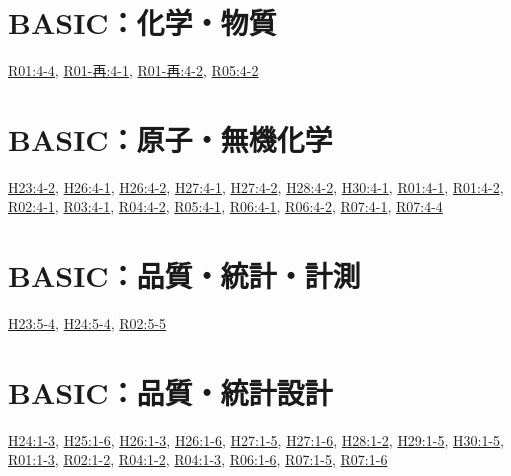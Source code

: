 \section{BASIC：化学・物質}
\hyperref[q:r01-reg-basic-4-4]{R01:4-4}, \hyperref[q:r01-ret-basic-4-1]{R01-再:4-1}, \hyperref[q:r01-ret-basic-4-2]{R01-再:4-2}, \hyperref[q:r05-reg-basic-4-2]{R05:4-2}
\section{BASIC：原子・無機化学}
\hyperref[q:h23-reg-basic-4-2]{H23:4-2}, \hyperref[q:h26-reg-basic-4-1]{H26:4-1}, \hyperref[q:h26-reg-basic-4-2]{H26:4-2}, \hyperref[q:h27-reg-basic-4-1]{H27:4-1}, \hyperref[q:h27-reg-basic-4-2]{H27:4-2}, \hyperref[q:h28-reg-basic-4-2]{H28:4-2}, \hyperref[q:h30-reg-basic-4-1]{H30:4-1}, \hyperref[q:r01-reg-basic-4-1]{R01:4-1}, \hyperref[q:r01-reg-basic-4-2]{R01:4-2}, \hyperref[q:r02-reg-basic-4-1]{R02:4-1}, \hyperref[q:r03-reg-basic-4-1]{R03:4-1}, \hyperref[q:r04-reg-basic-4-2]{R04:4-2}, \hyperref[q:r05-reg-basic-4-1]{R05:4-1}, \hyperref[q:r06-reg-basic-4-1]{R06:4-1}, \hyperref[q:r06-reg-basic-4-2]{R06:4-2}, \hyperref[q:r07-reg-basic-4-1]{R07:4-1}, \hyperref[q:r07-reg-basic-4-4]{R07:4-4}
\section{BASIC：品質・統計・計測}
\hyperref[q:h23-reg-basic-5-4]{H23:5-4}, \hyperref[q:h24-reg-basic-5-4]{H24:5-4}, \hyperref[q:r02-reg-basic-5-5]{R02:5-5}
\section{BASIC：品質・統計設計}
\hyperref[q:h24-reg-basic-1-3]{H24:1-3}, \hyperref[q:h25-reg-basic-1-6]{H25:1-6}, \hyperref[q:h26-reg-basic-1-3]{H26:1-3}, \hyperref[q:h26-reg-basic-1-6]{H26:1-6}, \hyperref[q:h27-reg-basic-1-5]{H27:1-5}, \hyperref[q:h27-reg-basic-1-6]{H27:1-6}, \hyperref[q:h28-reg-basic-1-2]{H28:1-2}, \hyperref[q:h29-reg-basic-1-5]{H29:1-5}, \hyperref[q:h30-reg-basic-1-5]{H30:1-5}, \hyperref[q:r01-reg-basic-1-3]{R01:1-3}, \hyperref[q:r02-reg-basic-1-2]{R02:1-2}, \hyperref[q:r04-reg-basic-1-2]{R04:1-2}, \hyperref[q:r04-reg-basic-1-3]{R04:1-3}, \hyperref[q:r06-reg-basic-1-6]{R06:1-6}, \hyperref[q:r07-reg-basic-1-5]{R07:1-5}, \hyperref[q:r07-reg-basic-1-6]{R07:1-6}
